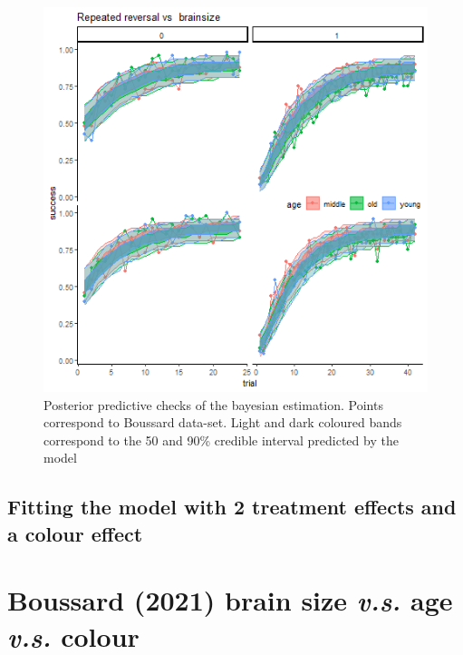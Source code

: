 \documentclass[
]{article}
\begin{document}
\begin{figure}

\includegraphics[width=6.67in,]{images/boussard2_ppchecks} \hfill{}

\caption{Posterior predictive checks of the bayesian estimation. Points correspond to Boussard data-set. Light and dark coloured bands correspond to the 50 and 90\% credible interval predicted by the model}\label{fig:unnamed-chunk-9}
\end{figure}

\hypertarget{fitting-the-model-with-2-treatment-effects-and-a-colour-effect}{%
\subsection{Fitting the model with 2 treatment effects and a colour
effect}\label{fitting-the-model-with-2-treatment-effects-and-a-colour-effect}}

\hypertarget{boussard--boussard_link_2021-brain-size-v.s.-age-v.s.-colour}{%
\section{\texorpdfstring{Boussard (2021) brain size \emph{v.s.} age
\emph{v.s.}
colour}{Boussard (2021) brain size v.s. age v.s. colour}}\label{boussard--boussard_link_2021-brain-size-v.s.-age-v.s.-colour}}
\end{document}
